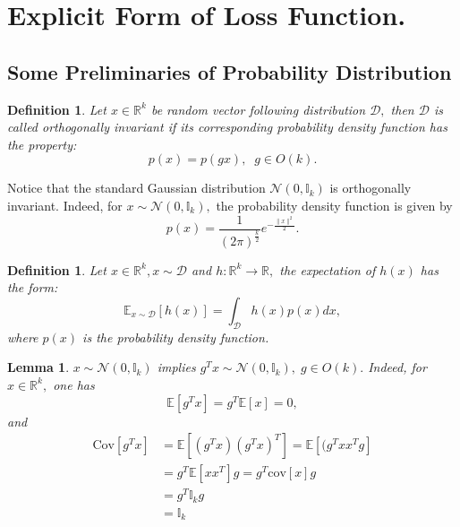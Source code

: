 \documentclass{amsart}%
\def\noi{\noindent}
\newtheorem{definition}[theorem]{Definition}
\newtheorem{lemma}[theorem]{Lemma}
\def\noi{\noindent}
\begin{document}
\section{Explicit Form of Loss Function.}\label{app:A}
\subsection{Some Preliminaries of Probability Distribution}
\begin{definition}
Let $ x\in \mathbb{R}^k$ be random vector following distribution $\mathcal D,$ then $\mathcal D$ is called orthogonally invariant if its corresponding probability density function has the property:
\[
p( x)=p(g x),\;\; g\in O(k). 
\]   
\end{definition}
\noi Notice that the standard Gaussian distribution $ \mathcal{N}(0,\mathbb{I}_k)$ is orthogonally invariant. Indeed, for $ x\sim \mathcal{N}(0,\mathbb{I}_k),$ the probability density function is given by
\begin{equation}
p(x)=\frac{1}{(2\pi)^{\frac{k}{2}}}e^{-\frac{
\|x\|^2}{2}}.
\end{equation}
\begin{definition}
Let $ x\in \mathbb{R}^k, x\sim \mathcal{D}$ and $h:\mathbb{R}^k\to \mathbb{R},$ the expectation of $h(x)$ has the form:
\[
\mathbb{E}_{ x\sim \mathcal{D}}[h( x)]=\int_{\mathcal{D}} h(x)p(x)d x,
\]
where $p( x)$ is the probability density function.
\end{definition}
\begin{lemma}\label{le:dist}
$ x\sim \mathcal{N}(0,\mathbb{I}_k)$ implies $g^T x\sim \mathcal{N}(0,\mathbb{I}_k),\; g\in O(k).$ Indeed, for $x\in \mathbb R^k,$ one has 
\[
\mathbb E[g^Tx]=g^T \mathbb E[ x]=0,
\] and 
\begin{align*}
\text{Cov}[g^T x]&=\mathbb E[(g^Tx)(g^T x)^T]=\mathbb E[(g^T x  x^Tg]\\
&=g^T \mathbb E[ x  x^T]g=g^T\text{cov}[x]g\\
&=g^T\mathbb{I}_kg\\
&=\mathbb{I}_k
\end{align*}
\end{lemma}
\end{document}
